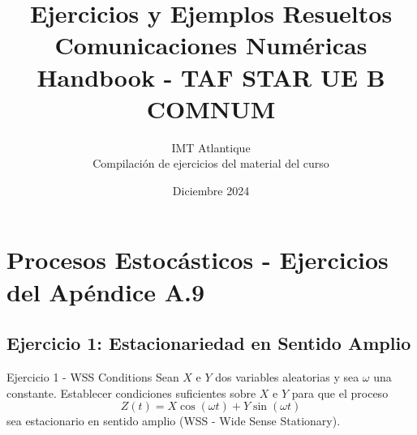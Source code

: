 \documentclass[10pt,a4paper]{article}
\title{\textbf{Ejercicios y Ejemplos Resueltos\\Comunicaciones Numéricas}\\
\large Handbook - TAF STAR UE B COMNUM}
\author{IMT Atlantique\\
Compilación de ejercicios del material del curso}
\date{Diciembre 2024}
\begin{document}
\maketitle
\tableofcontents
\newpage

\section{Procesos Estocásticos - Ejercicios del Apéndice A.9}

\subsection{Ejercicio 1: Estacionariedad en Sentido Amplio}

\begin{ejercicio}{Ejercicio 1 - WSS Conditions}
Sean $X$ e $Y$ dos variables aleatorias y sea $\omega$ una constante. Establecer condiciones suficientes sobre $X$ e $Y$ para que el proceso
\[
Z(t) = X \cos(\omega t) + Y \sin(\omega t)
\]
sea estacionario en sentido amplio (WSS - Wide Sense Stationary).
\end{ejercicio}
\end{document}

